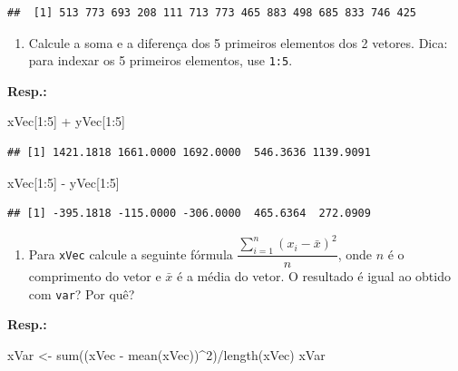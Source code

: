 \documentclass[
]{article}
\newenvironment{Shaded}{\begin{snugshade}}{\end{snugshade}}
\newcommand{\DecValTok}[1]{\textcolor[rgb]{0.00,0.00,0.81}{#1}}
\newcommand{\FunctionTok}[1]{\textcolor[rgb]{0.00,0.00,0.00}{#1}}
\newcommand{\NormalTok}[1]{#1}
\newcommand{\OtherTok}[1]{\textcolor[rgb]{0.56,0.35,0.01}{#1}}
\newcommand{\SpecialCharTok}[1]{\textcolor[rgb]{0.00,0.00,0.00}{#1}}
\providecommand{\tightlist}{%
  \setlength{\itemsep}{0pt}\setlength{\parskip}{0pt}}
\begin{document}
\begin{verbatim}
##  [1] 513 773 693 208 111 713 773 465 883 498 685 833 746 425
\end{verbatim}

\begin{enumerate}
\def\labelenumi{\arabic{enumi}.}
\setcounter{enumi}{6}
\tightlist
\item
  Calcule a soma e a diferença dos 5 primeiros elementos dos 2 vetores. Dica: para indexar os 5 primeiros elementos, use \texttt{1:5}.
\end{enumerate}

\textbf{Resp.:}

\begin{Shaded}
\begin{Highlighting}[]
\NormalTok{xVec[}\DecValTok{1}\SpecialCharTok{:}\DecValTok{5}\NormalTok{] }\SpecialCharTok{+}\NormalTok{ yVec[}\DecValTok{1}\SpecialCharTok{:}\DecValTok{5}\NormalTok{]}
\end{Highlighting}
\end{Shaded}

\begin{verbatim}
## [1] 1421.1818 1661.0000 1692.0000  546.3636 1139.9091
\end{verbatim}

\begin{Shaded}
\begin{Highlighting}[]
\NormalTok{xVec[}\DecValTok{1}\SpecialCharTok{:}\DecValTok{5}\NormalTok{] }\SpecialCharTok{{-}}\NormalTok{ yVec[}\DecValTok{1}\SpecialCharTok{:}\DecValTok{5}\NormalTok{]}
\end{Highlighting}
\end{Shaded}

\begin{verbatim}
## [1] -395.1818 -115.0000 -306.0000  465.6364  272.0909
\end{verbatim}

\begin{enumerate}
\def\labelenumi{\arabic{enumi}.}
\setcounter{enumi}{7}
\tightlist
\item
  Para \texttt{xVec} calcule a seguinte fórmula \(\dfrac{\sum_ {i = 1}^n \left(x_i - \bar{x}\right)^2}{n}\), onde \(n\) é o comprimento do vetor e \(\bar{x}\) é a média do vetor. O resultado é igual ao obtido com \texttt{var}? Por quê?
\end{enumerate}

\textbf{Resp.:}

\begin{Shaded}
\begin{Highlighting}[]
\NormalTok{xVar }\OtherTok{\textless{}{-}} \FunctionTok{sum}\NormalTok{((xVec }\SpecialCharTok{{-}} \FunctionTok{mean}\NormalTok{(xVec))}\SpecialCharTok{\^{}}\DecValTok{2}\NormalTok{)}\SpecialCharTok{/}\FunctionTok{length}\NormalTok{(xVec)}
\NormalTok{xVar}
\end{Highlighting}
\end{Shaded}
\end{document}
